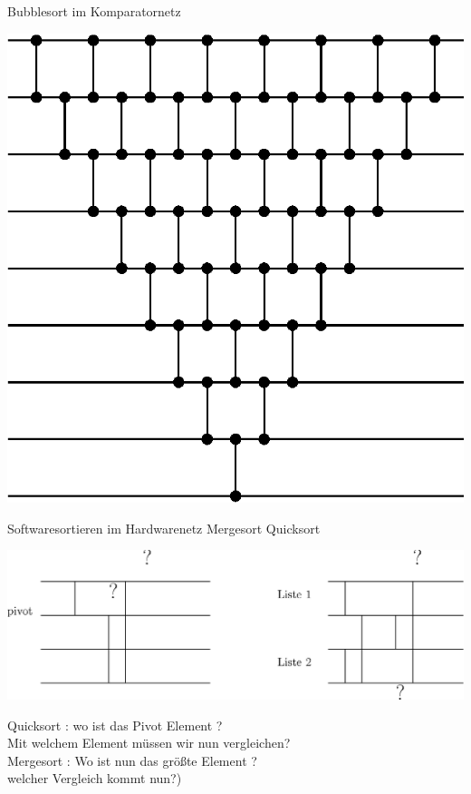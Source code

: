 \documentclass[ucs,9pt]{beamer}
\begin{document}
\begin{frame}{Bubblesort im Komparatornetz}
	\begin{center}
	    \includegraphics[scale=0.65]{bubblesort.eps}
	\end{center}
\end{frame}

\begin{frame}{Softwaresortieren im Hardwarenetz}
Mergesort Quicksort
    \begin{center}
    		\includegraphics[scale=0.65]{mergesort.eps}
\end{center}     
 {Quicksort : wo ist das Pivot Element ?\\ Mit welchem Element müssen wir nun vergleichen?}\\
 {Mergesort : Wo ist nun das größte Element ? \\welcher Vergleich kommt nun?)}
\end{frame}
\end{document}
